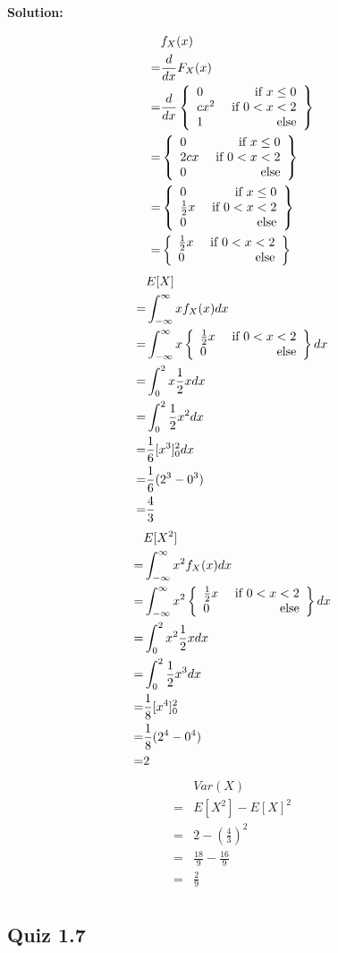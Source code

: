 \documentclass{article}
\begin{document}
\textbf{Solution:}

\begin{align*}
	 & f_X(x) \\
	=& \frac{d}{dx}F_X(x) \\
	=& \frac{d}{dx}\left\{\begin{array}{lr}0 & \text{ if }x\leq 0\\ cx^2 & \text{ if }0<x<2 \\1 & \text{ else}\end{array}\right\} \\
	=& \left\{\begin{array}{lr}0 & \text{ if }x\leq 0\\ 2cx & \text{ if }0<x<2 \\0 & \text{ else}\end{array}\right\} \\
	=& \left\{\begin{array}{lr}0 & \text{ if }x\leq 0\\ \frac12x & \text{ if }0<x<2 \\0 & \text{ else}\end{array}\right\} \\
	=& \left\{\begin{array}{lr}\frac12x & \text{ if }0<x<2\\0 & \text{ else}\end{array}\right\} \\
\end{align*}
\begin{align*}
	 & E[X] \\
	=& \int_{-\infty}^\infty x f_X(x)dx \\
	=& \int_{-\infty}^\infty x \left\{\begin{array}{lr}\frac12x & \text{ if }0<x<2\\0 & \text{ else}\end{array}\right\}dx \\
	=& \int_{0}^2 x \frac12x dx \\
	=& \int_{0}^2 \frac12x^2 dx \\
	=& \frac16\lbrack x^3\rbrack_0^2 dx \\
	=& \frac16(2^3-0^3) \\
	=& \frac{4}{3} \\
\end{align*}
\begin{align*}
	 & E[X^2] \\
	=& \int_{-\infty}^\infty x^2 f_X(x)dx \\
	=& \int_{-\infty}^\infty x^2 \left\{\begin{array}{lr}\frac12x & \text{ if }0<x<2\\0 & \text{ else}\end{array}\right\}dx \\
	=& \int_{0}^2 x^2 \frac12x dx \\
	=& \int_{0}^2 \frac12x^3 dx \\
	=& \frac18\lbrack x^4\rbrack_0^2 \\
	=& \frac18(2^4-0^4) \\
	=& 2 \\
\end{align*}
\begin{align*}
	 & Var(X) \\
	=& E[X^2]-E[X]^2 \\
	=& 2-\left(\frac{4}{3}\right)^2 \\
	=& \frac{18}{9}-\frac{16}{9} \\
	=& \frac{2}{9} \\
\end{align*}

\subsection{Quiz 1.7}
\end{document}
